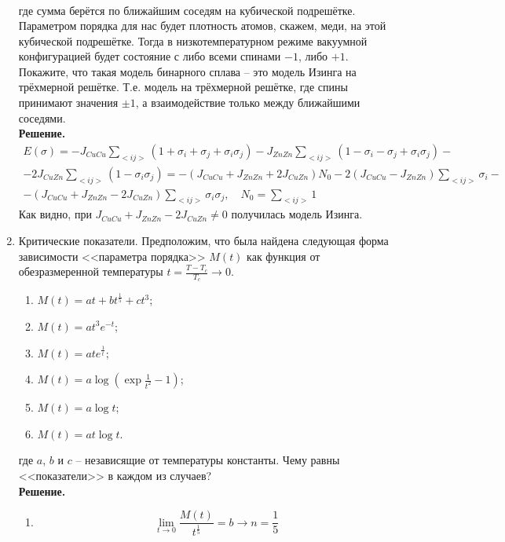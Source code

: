 \documentclass[12pt]{article}
\theoremstyle{definition}
\begin{document}
\begin{enumerate}
\begin{multline}
    \end{multline}
    где сумма берётся по ближайшим соседям на кубической подрешётке.\\
    Параметром порядка для нас будет плотность атомов, скажем, меди, на этой кубической подрешётке. Тогда в низкотемпературном режиме вакуумной конфигурацией будет состояние с либо всеми спинами $-1$, либо $+1$.\\
    Покажите, что такая модель бинарного сплава -- это модель Изинга на трёхмерной решётке. Т.е. модель на трёхмерной решётке, где спины принимают значения $\pm1$, а взаимодействие только между ближайшими соседями.\\
    \textbf{Решение.}
    \begin{multline}
        E(\sigma)=-J_{CuCu}\sum\limits_{<ij>}(1+\sigma_i+\sigma_j+\sigma_i\sigma_j)-J_{ZnZn}\sum\limits_{<ij>}(1-\sigma_i-\sigma_j+\sigma_i\sigma_j)-\\-2J_{CuZn}\sum\limits_{<ij>}(1-\sigma_i\sigma_j)=-(J_{CuCu}+J_{ZnZn}+2J_{CuZn})N_0-2(J_{CuCu}-J_{ZnZn})\sum\limits_{<ij>}\sigma_i-\\-(J_{CuCu}+J_{ZnZn}-2J_{CuZn})\sum\limits_{<ij>}\sigma_i\sigma_j,\quad N_0=\sum\limits_{<ij>}1
    \end{multline}
    Как видно, при $J_{CuCu}+J_{ZnZn}-2J_{CuZn}\neq0$ получилась модель Изинга.
    \item Критические показатели. Предположим, что была найдена следующая форма зависимости <<параметра порядка>> $M(t)$ как функция от обезразмеренной температуры $t=\frac{T-T_c}{T_c}\rightarrow0$.
    \begin{enumerate}
        \item $M(t)=at+bt^\frac{1}{5}+ct^3$;
        \item $M(t)=at^3e^{-t}$;
        \item $M(t)=ate^\frac{1}{t}$;
        \item $M(t)=a\log\left(\exp\frac{1}{t^2}-1\right)$;
        \item $M(t)=a\log t$;
        \item $M(t)=at\log t$.
    \end{enumerate}
    где $a$, $b$ и $c$ -- независящие от температуры константы. Чему равны <<показатели>> в каждом из случаев?\\
    \textbf{Решение.}
    \begin{enumerate}
        \item 
    \begin{equation}
        \lim\limits_{t\rightarrow0}\frac{M(t)}{t^\frac{1}{5}}=b\rightarrow \boxed{n=\frac{1}{5}}

\end{equation}
\end{enumerate}
\end{enumerate}
\end{document}

